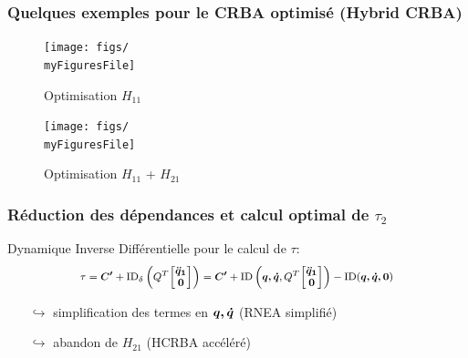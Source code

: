 \documentclass[10pt]{beamer}
\begin{document}
\begin{frame}
  \frametitle{Quelques exemples pour le CRBA optimisé (Hybrid CRBA)}

	\begin{figure}[H]
	  \begin{center}
	  \vspace{-.2cm}
	  \texttt{[image: figs/\\myFiguresFile]}
	  \caption{Optimisation $H_{11}$}
	  \texttt{[image: figs/\\myFiguresFile]}
	  \vspace{-.2cm}\caption{Optimisation $H_{11}$ + $H_{21}$}
	  \end{center}
	\end{figure}
	
\end{frame}

\begin{frame}
  \frametitle{Réduction des dépendances et calcul optimal de $\tau_2$}

  Dynamique Inverse Différentielle pour le calcul de $\tau$:
	\begin{equation}\footnotesize
	\tau = \boldsymbol{C'} + \mathrm{ID}_{\delta} \left( Q^T \boldsymbol{\begin{bmatrix} 
	                                                         \ddot{q}_1 \\
	                                                         0 
	                                                       \end{bmatrix}} \right) \label{equ_tauIDdiff_2}
	=
	\boldsymbol{C'} + \mathrm{ID} \left( \boldsymbol{q,\dot{q}},Q^T \boldsymbol{\begin{bmatrix}
	                                                         \ddot{q}_1 \\      
	                                                          0         
	                                                       \end{bmatrix}} \right) - \mathrm{ID}(\boldsymbol{q,\dot{q},0})
	\end{equation}
	
	\bigskip
	
	\begin{itemize}
	\item[$\hookrightarrow$] simplification des termes en $\boldsymbol{q, \dot{q}}$ (RNEA simplifié)
	\item[$\hookrightarrow$] abandon de $H_{21}$ (HCRBA accéléré)
	\end{itemize}
  
\end{frame}
\end{document}
